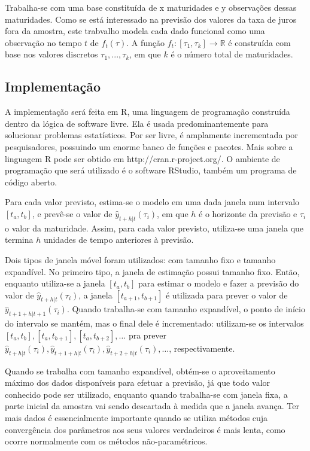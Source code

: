 \documentclass[
	12pt,				%
	openright,			%
	oneside,			%
	a4paper,			%
	english,			%
	brazil				%
	]{dissertacao-ufrgs-abntex2}
\begin{document}
Trabalha-se com uma base constituída de x  maturidades e y observações dessas maturidades. Como se está interessado na previsão dos valores da taxa de juros fora da amostra, este trabvalho modela cada dado funcional como uma observação no tempo $t$ de $f_t(\tau)$. A função $f_t:[\tau_1,\tau_k] \rightarrow \mathbb{R}$ é construída com base nos valores discretos ${\tau_1, ..., \tau_k}$, em que $k$ é o número total de maturidades.



\subsection*{Implementação}

A implementação será feita em R, uma linguagem de programação construída dentro da lógica de software livre. Ela é usada predominantemente para solucionar problemas estatísticos. Por ser livre, é amplamente incrementada por pesquisadores, possuindo um enorme banco de funções e pacotes. Mais sobre a linguagem R pode ser obtido em http://cran.r-project.org/. O ambiente de programação que será utilizado é o software RStudio, também um programa de código aberto.

Para cada valor previsto, estima-se o modelo em uma dada janela num intervalo $[t_a,t_b]$, e prevê-se o valor de  $\hat{y}_{t+h|t}(\tau_i)$, em que $h$ é o horizonte da previsão e $\tau_i$ o valor da maturidade. Assim, para cada valor previsto, utiliza-se uma janela que termina $h$ unidades de tempo anteriores à previsão.

Dois tipos de janela móvel foram utilizados: com tamanho fixo e tamanho expandível. 
No primeiro tipo, a janela de estimação possui tamanho fixo. Então, enquanto utiliza-se a janela $[t_a,t_b]$ para estimar o modelo e fazer a previsão do valor de $\hat{y}_{t+h|t}(\tau_i)$, a janela $[t_{a+1},t_{b+1}]$ é utilizada para prever o valor de $\hat{y}_{t+1+h|t+1}(\tau_i)$. Quando trabalha-se com tamanho expandível, o ponto de início do intervalo se mantém, mas o final dele é incrementado: utilizam-se os intervalos $[t_{a},t_{b}] ,[t_{a},t_{b+1}],[t_{a},t_{b+2}],\dots$  pra prever $\hat{y}_{t+h|t}(\tau_i),\hat{y}_{t+1+h|t}(\tau_i),\hat{y}_{t+2+h|t}(\tau_i),\dots$, respectivamente.

Quando se trabalha com tamanho expandível, obtém-se o aproveitamento máximo dos dados disponíveis para efetuar a previsão, já que todo valor conhecido pode ser utilizado, enquanto quando trabalha-se com janela fixa, a parte inicial da amostra vai sendo descartada à medida que a janela avança. Ter mais dados é essencialmente importante quando se utiliza métodos cuja convergência dos parâmetros aos seus valores verdadeiros é mais lenta, como ocorre normalmente com os métodos não-paramétricos. 
\end{document}
